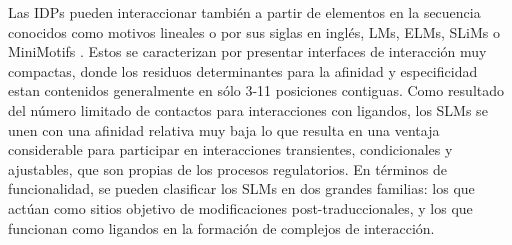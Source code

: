 % 
% 
Las IDPs pueden interaccionar también a partir de elementos en la secuencia conocidos como motivos lineales o por sus siglas en inglés, LMs, ELMs, SLiMs o MiniMotifs \cite{davey2012attributes}. 
Estos se caracterizan por presentar interfaces de interacción muy compactas, donde los residuos determinantes para la afinidad y especificidad estan contenidos generalmente en sólo 3-11 posiciones contiguas.
Como resultado del número limitado de contactos para interacciones con ligandos, los SLMs se unen con una afinidad relativa muy baja lo que resulta en una ventaja considerable 
para participar en interacciones transientes, condicionales y  ajustables, que son propias de los procesos regulatorios.
En términos de funcionalidad, se pueden clasificar los SLMs en dos grandes familias: los que actúan como sitios objetivo de modificaciones post-traduccionales, 
y los que funcionan como ligandos en la formación de complejos de interacción.

% 
% 



